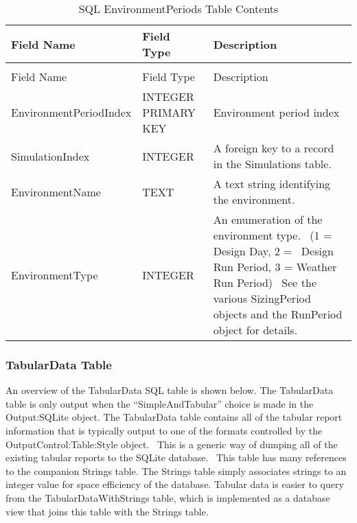\begin{longtable}[c]{>{\raggedright}p{1.5in}>{\raggedright}p{1.5in}>{\raggedright}p{3.0in}}
\caption{SQL EnvironmentPeriods Table Contents \label{table:table-37.-sql-environmentperiods-table}} \tabularnewline
\toprule 
Field Name & Field Type & Description \tabularnewline
\midrule
\endfirsthead

\caption[]{SQL EnvironmentPeriods Table Contents} \tabularnewline
\toprule 
Field Name & Field Type & Description \tabularnewline
\midrule
\endhead

Environment\-Period\-Index & INTEGER PRIMARY KEY & Environment period index \tabularnewline
SimulationIndex & INTEGER & A foreign key to a record in the Simulations table. \tabularnewline
EnvironmentName & TEXT & A text string identifying the environment. \tabularnewline
EnvironmentType & INTEGER & An enumeration of the environment type.~ (1 = Design Day, 2 =~ Design Run Period, 3 = Weather Run Period)~ See the various SizingPeriod objects and the RunPeriod object for details. \tabularnewline
\bottomrule
\end{longtable}

\subsubsection{TabularData Table}

An overview of the TabularData SQL table is shown below. The TabularData table is only output when the “SimpleAndTabular” choice is made in the Output:SQLite object. The TabularData table contains all of the tabular report information that is typically output to one of the formats controlled by the OutputControl:Table:Style object.  This is a generic way of dumping all of the existing tabular reports to the SQLite database.  This table has many references to the companion Strings table. The Strings table simply associates strings to an integer value for space efficiency of the database. Tabular data is easier to query from the TabularDataWithStrings table, which is implemented as a database view that joins this table with the Strings table.

